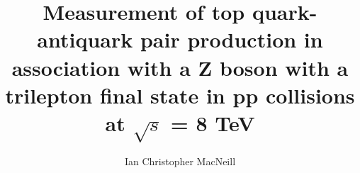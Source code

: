 \title{Measurement of top quark-antiquark pair production in association with a Z boson with a trilepton final state in pp collisions at $\sqrt{s}$ = 8 TeV}

\author{Ian Christopher MacNeill}





